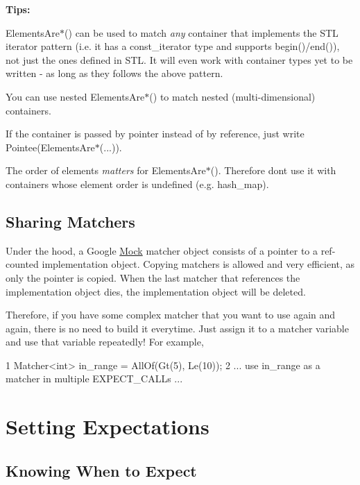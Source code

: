 {\bfseries Tips\+:}


\begin{DoxyItemize}
\item {\ttfamily Elements\+Are$\ast$()} can be used to match {\itshape any} container that implements the S\+TL iterator pattern (i.\+e. it has a {\ttfamily const\+\_\+iterator} type and supports {\ttfamily begin()/end()}), not just the ones defined in S\+TL. It will even work with container types yet to be written -\/ as long as they follows the above pattern.
\item You can use nested {\ttfamily Elements\+Are$\ast$()} to match nested (multi-\/dimensional) containers.
\item If the container is passed by pointer instead of by reference, just write {\ttfamily Pointee(Elements\+Are$\ast$(...))}.
\item The order of elements {\itshape matters} for {\ttfamily Elements\+Are$\ast$()}. Therefore don\textquotesingle{}t use it with containers whose element order is undefined (e.\+g. {\ttfamily hash\+\_\+map}).
\end{DoxyItemize}

\subsection*{Sharing Matchers}

Under the hood, a Google \hyperlink{class_mock}{Mock} matcher object consists of a pointer to a ref-\/counted implementation object. Copying matchers is allowed and very efficient, as only the pointer is copied. When the last matcher that references the implementation object dies, the implementation object will be deleted.

Therefore, if you have some complex matcher that you want to use again and again, there is no need to build it everytime. Just assign it to a matcher variable and use that variable repeatedly! For example,


\begin{DoxyCode}
1 Matcher<int> in\_range = AllOf(Gt(5), Le(10));
2 ... use in\_range as a matcher in multiple EXPECT\_CALLs ...
\end{DoxyCode}


\section*{Setting Expectations}

\subsection*{Knowing When to Expect}

